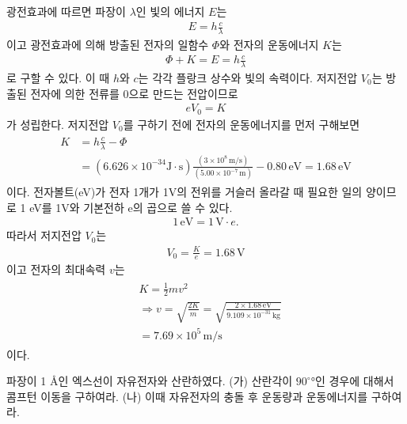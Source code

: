 \documentclass[tightenlines,floatfix,nofootinbib,superscriptaddress,fleqn]{revtex4}
\begin{document}
광전효과에 따르면 파장이 $\lambda$인 빛의 에너지 $E$는
\begin{align}
  E = h\frac{c}{\lambda}
\end{align}
이고 광전효과에 의해 방출된 전자의 일함수 $\Phi$와 전자의 운동에너지 $K$는
\begin{align}
  \Phi+K = E = h\frac{c}{\lambda}
\end{align}
로 구할 수 있다. 이 때 $h$와 $c$는 각각 플랑크 상수와 빛의 속력이다. 
저지전압 $V_0$는 방출된 전자에 의한 전류를 $0$으로 만드는 전압이므로 
\begin{align}
  eV_0 = K
\end{align}
가 성립한다. 저지전압 $V_0$를 구하기 전에 전자의 운동에너지를 먼저 구해보면
\begin{align}
  \begin{split}
    K &=h\frac{c}{\lambda}-\Phi \\ %
    &= (6.626\times 10^{-34}\mathrm{J\cdot s})
    \frac{(3\times 10^{8}\,\mathrm{m/s})}{(5.00\times 10^{-7}\,\mathrm{m})}
    -0.80\,\mathrm{eV}
    =1.68\,\mathrm{eV}
  \end{split}
\end{align}
이다. 전자볼트(eV)가 전자 1개가 1V의 전위를 거슬러 올라갈 때 필요한 일의 양이므로
1 eV를 1V와 기본전하 e의 곱으로 쓸 수 있다.
\begin{align}
  1\,\mathrm{eV} = 1\,\mathrm{V}\cdot e.
\end{align}
따라서 저지전압 $V_0$는
\begin{align}
  V_0 = \frac{K}{e} = 1.68\,\mathrm{V}
\end{align}
이고 전자의 최대속력 $v$는
\begin{align}
  \begin{split}
    &K = \frac{1}{2}mv^2 \\
    &\Longrightarrow
    v = \sqrt{\frac{2K}{m}}
    = \sqrt{\frac{2\times 1.68\,\mathrm{eV}}{9.109\times 10^{-31}\,\mathrm{kg}}}\\
    &=7.69\times{10^{5}}\,\mathrm{m/s}
  \end{split}
\end{align}
이다.
\vspace{1cm}


파장이 1 \AA 인 엑스선이 자유전자와 산란하였다.
(가) 산란각이 $90^\circ$°인 경우에 대해서 콤프턴 이동을 구하여라.
(나) 이때 자유전자의 충돌 후 운동량과 운동에너지를 구하여라.
\end{document}
